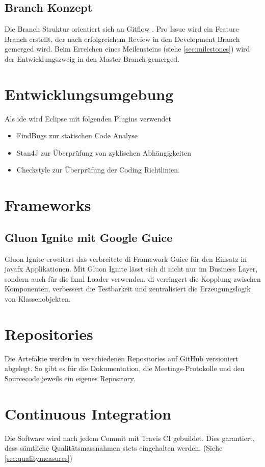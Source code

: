 \documentclass[11pt,a4paper,english,oneside]{book}
\numberwithin{equation}{chapter}
\begin{document}
	\subsection{Branch Konzept}
	Die Branch Struktur orientiert sich an Gitflow \cite{gitflow}. Pro Issue wird ein Feature Branch erstellt, der nach erfolgreichem Review in den Development Branch gemerged wird. Beim Erreichen eines Meilensteins (siehe \ref{sec:milestones}) wird der Entwicklungszweig in den Master Branch gemerged.
	
	\section{Entwicklungsumgebung}
	Als \gls{ide} wird Eclipse mit folgenden Plugins verwendet
	\begin{itemize}
		\item FindBugs \cite{findbugs} zur statischen Code Analyse
		\item Stan4J \cite{stan4j} zur Überprüfung von zyklischen Abhängigkeiten
		\item Checkstyle \cite{checkstyle} zur Überprüfung der Coding Richtlinien.
	\end{itemize}

	\section{Frameworks}
	
	\subsection{Gluon Ignite mit Google Guice} \label{DI}
	Gluon Ignite \cite{gluonignite} erweitert das verbreitete \gls{di}-Framework Guice \cite{guice} für den Einsatz in \gls{javafx} Applikationen. Mit Gluon Ignite lässt sich \gls{di} nicht nur im Business Layer, sondern auch für die \gls{fxml} Loader verwenden. \gls{di} verringert die Kopplung zwischen Komponenten, verbessert die Testbarkeit und zentralisiert die Erzeugungslogik von Klassenobjekten.

	\section{Repositories}
	Die Artefakte werden in verschiedenen Repositories auf GitHub versioniert abgelegt. So gibt es für die Dokumentation, die Meetings-Protokolle und den Sourcecode jeweils ein eigenes Repository.

	\section{Continuous Integration}
	Die Software wird nach jedem Commit mit Travis CI \cite{travisci} gebuildet. Dies garantiert, dass sämtliche Qualitätsmassnahmen stets eingehalten werden. (Siehe \ref{sec:qualitymeasures})
	
\end{document}
